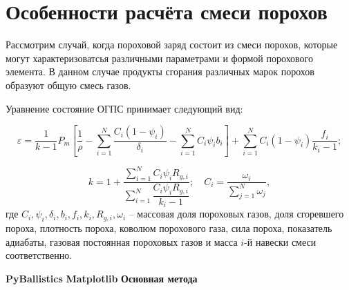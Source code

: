 \documentclass[14pt, a4paper]{report} %
\begin{document}
\section{Особенности расчёта смеси порохов}

Рассмотрим случай, когда пороховой заряд состоит из смеси порохов, которые могут характеризоватсья различными параметрами и формой порохового элемента. В данном случае продукты сгорания различных марок порохов образуют общую смесь газов.

Уравнение состояние ОГПС принимает следующий вид:

\begin{equation}
\varepsilon = \frac{1}{k-1} P_m \left[ \frac{1}{\rho} - \sum_{i=1}^N \frac{C_i (1 - \psi_i)}{\delta_i} - \sum_{i=1}^N C_i \psi_i b_i \right] + \sum_{i=1}^N C_i (1 - \psi_i) \frac{f_i}{k_i - 1}; 
\end{equation}

\begin{equation}
k = 1 + \frac{\sum_{i=1}^N C_i \psi_i R_{g,i}}{\sum_{i=1}^N \dfrac{C_i \psi_i R_{g,i}}{k_i - 1}}; \quad C_i = \frac{\omega_i}{\sum_{j=1}^N \omega_j},
\end{equation}
где \( C_i, \psi_i, \delta_i, b_i, f_i, k_i, R_{g,i}, \omega_i \) -- массовая доля пороховых газов, доля сгоревшего пороха, плотность пороха, коволюм порохового газа, сила пороха, показатель адиабаты, газовая постоянная пороховых газов и масса \(i\)-й навески смеси соответственно.
\newpage
\begin{thebibliography}{9}
\bibitem{} \textbf{PyBallistics}
\bibitem{} \textbf{Matplotlib} 
\bibitem{} \textbf{Основная метода} 

\end{thebibliography}
\end{document}
